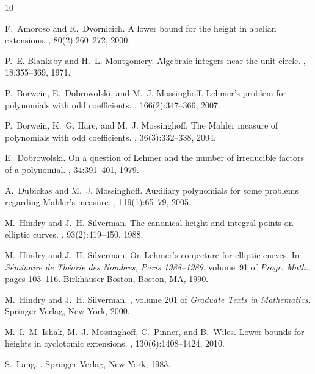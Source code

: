 \documentclass[12pt,reqno]{amsart}
\begin{document}
\begin{thebibliography}{10}


F.~Amoroso and R.~Dvornicich.
\newblock A lower bound for the height in abelian extensions.
, 80(2):260--272, 2000.

P.~E. Blanksby and H.~L. Montgomery.
\newblock Algebraic integers near the unit circle.
, 18:355--369, 1971.

P.~Borwein, E.~Dobrowolski, and M.~J. Mossinghoff.
\newblock Lehmer's problem for polynomials with odd coefficients.
, 166(2):347--366, 2007.

P.~Borwein, K.~G. Hare, and M.~J. Mossinghoff.
\newblock The {M}ahler measure of polynomials with odd coefficients.
, 36(3):332--338, 2004.

E.~Dobrowolski.
\newblock On a question of {L}ehmer and the number of irreducible factors of a
  polynomial.
, 34:391--401, 1979.

A.~Dubickas and M.~J. Mossinghoff.
\newblock Auxiliary polynomials for some problems regarding {M}ahler's measure.
, 119(1):65--79, 2005.

M.~Hindry and J.~H. Silverman.
\newblock The canonical height and integral points on elliptic curves.
, 93(2):419--450, 1988.

M.~Hindry and J.~H. Silverman.
\newblock On {L}ehmer's conjecture for elliptic curves.
\newblock In {\em S\'eminaire de Th\'eorie des Nombres, Paris 1988--1989},
  volume~91 of {\em Progr. Math.}, pages 103--116. Birkh\"auser Boston, Boston,
  MA, 1990.

M.~Hindry and J.~H. Silverman.
, volume 201 of {\em
  Graduate Texts in Mathematics}.
\newblock Springer-Verlag, New York, 2000.

M.~I.~M. Ishak, M.~J. Mossinghoff, C.~Pinner, and B.~Wiles.
\newblock Lower bounds for heights in cyclotomic extensions.
, 130(6):1408--1424, 2010.

S.~Lang.
.
\newblock Springer-Verlag, New York, 1983.


\end{thebibliography}
\end{document}
